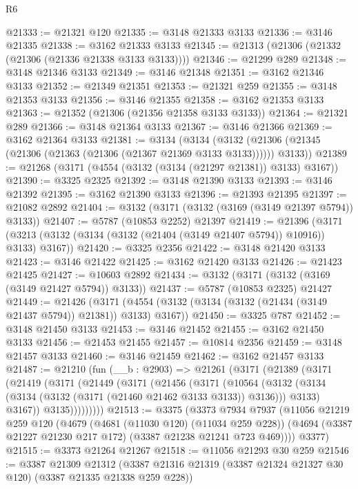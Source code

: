 \begin{lexlean}{R6}
\begin{coremodule}
@21333 := @21321 @120
@21335 := @3148 @21333 @3133
@21336 := @3146 @21335
@21338 := @3162 @21333 @3133
@21345 := @21313 (@21306 (@21332 (@21306 (@21336 @21338 @3133 @3133))))
@21346 := @21299 @289
@21348 := @3148 @21346 @3133
@21349 := @3146 @21348
@21351 := @3162 @21346 @3133
@21352 := @21349 @21351
@21353 := @21321 @259
@21355 := @3148 @21353 @3133
@21356 := @3146 @21355
@21358 := @3162 @21353 @3133
@21363 := @21352 (@21306 (@21356 @21358 @3133 @3133))
@21364 := @21321 @289
@21366 := @3148 @21364 @3133
@21367 := @3146 @21366
@21369 := @3162 @21364 @3133
@21381 := @3134
    (@3134 (@3132 (@21306 (@21345 (@21306 (@21363 (@21306 (@21367 @21369 @3133 @3133)))))) @3133))
@21389 := @21268 (@3171 (@4554 (@3132 (@3134 (@21297 @21381)) @3133) @3167))
@21390 := @3325 @2325
@21392 := @3148 @21390 @3133
@21393 := @3146 @21392
@21395 := @3162 @21390 @3133
@21396 := @21393 @21395
@21397 := @21082 @2892
@21404 := @3132 (@3171 (@3132 (@3169 (@3149 @21397 @5794)) @3133))
@21407 := @5787 (@10853 @2252) @21397
@21419 := @21396
    (@3171 (@3213 (@3132 (@3134 (@3132 (@21404 (@3149 @21407 @5794)) @10916)) @3133) @3167))
@21420 := @3325 @2356
@21422 := @3148 @21420 @3133
@21423 := @3146 @21422
@21425 := @3162 @21420 @3133
@21426 := @21423 @21425
@21427 := @10603 @2892
@21434 := @3132 (@3171 (@3132 (@3169 (@3149 @21427 @5794)) @3133))
@21437 := @5787 (@10853 @2325) @21427
@21449 := @21426
    (@3171 (@4554 (@3132 (@3134 (@3132 (@21434 (@3149 @21437 @5794)) @21381)) @3133) @3167))
@21450 := @3325 @787
@21452 := @3148 @21450 @3133
@21453 := @3146 @21452
@21455 := @3162 @21450 @3133
@21456 := @21453 @21455
@21457 := @10814 @2356
@21459 := @3148 @21457 @3133
@21460 := @3146 @21459
@21462 := @3162 @21457 @3133
@21487 := @21210
    (fun (__b : @2903) =>
    @21261
      (@3171
        (@21389
          (@3171
            (@21419
              (@3171
                (@21449
                  (@3171
                    (@21456
                      (@3171
                        (@10564
                          (@3132
                            (@3134 (@3134 (@3132 (@3171 (@21460 @21462 @3133 @3133)) @3136)))
                            @3133)
                          @3167))
                      @3135)))))))))
@21513 := @3375
    (@3373
      @7934
      @7937
      (@11056
        @21219
        @259
        @120
        (@4679
          (@4681 (@11030 @120) (@11034 @259 @228))
          (@4694 (@3387 @21227 @21230 @217 @172) (@3387 @21238 @21241 @723 @469))))
      @3377)
@21515 := @3373 @21264 @21267
@21518 := @11056 @21293 @30 @259
@21546 := @3387
    @21309
    @21312
    (@3387 @21316 @21319 (@3387 @21324 @21327 @30 @120) (@3387 @21335 @21338 @259 @228))

\end{coremodule}
\end{lexlean}
